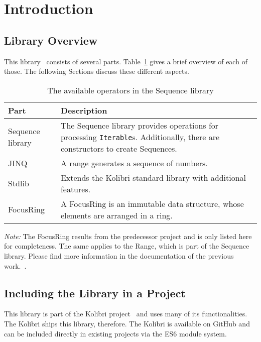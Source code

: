 \section{Introduction} %
\label{sec:Introduction}

\subsection{Library Overview} %
\label{sub:Sequence Library Overview}
This library~\cite{wildwyss_kolibri} consists of several parts. Table~\ref{tab:library_overview} gives a brief
overview of each of those. The following Sections discuss these different
aspects.

\begin{table}[H]
  \centering
  \begin{tabularx}{\textwidth}{| l | X |} \hline
    \textbf{Part} & \textbf{Description} \\ \hline
    Sequence library & The Sequence library provides operations for processing \lstinline{Iterable}s. Additionally, there are constructors to create Sequences.\\ \hline 
    JINQ & A range generates a sequence of numbers. \\ \hline 
    Stdlib & Extends the Kolibri standard library with additional features.\\ \hline 
    FocusRing & A FocusRing is an immutable data structure, whose elements are arranged in a ring. \\ \hline 
  \end{tabularx}
  \caption{The available operators in the Sequence library}
  \label{tab:library_overview}
\end{table}

\textit{Note:} The FocusRing results from the predecessor project and is only
listed here for completeness. The same applies to the Range, which is part of
the Sequence library. Please find more information in the documentation of
the previous work.~\cite{wild_ip5_2023}. 

\subsection{Including the Library in a Project} %
This library is part of the Kolibri project~\cite{kolibri} and uses many of its
functionalities. The Kolibri ships this library, therefore. The Kolibri
is available on GitHub and can be included directly in existing projects via
the ES6 module system.
\label{sub:Including the Library in a Project}
